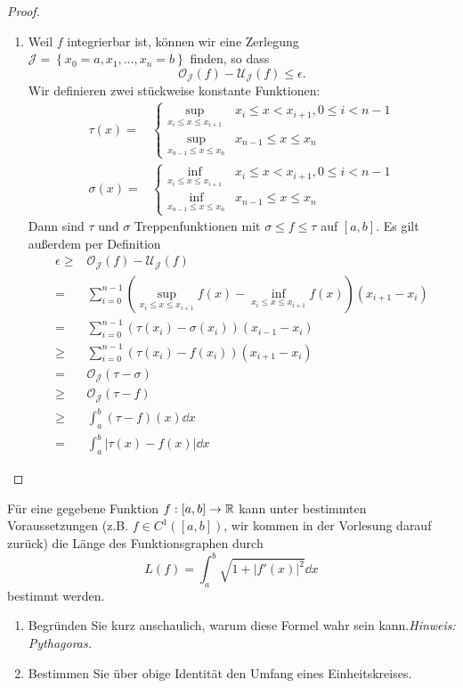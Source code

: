 \begin{proof}
	\begin{enumerate}[label=(\roman*)]
		\item Weil $f$ integrierbar ist, können wir eine Zerlegung $\mathcal{J}=\left\{ x_0=a,x_1,\dots, x_n=b \right\} $ finden, so dass
			\[
				\mathcal{O}_{\mathcal{J}}(f)-\mathcal{U}_{\mathcal{J}}(f)\le \epsilon
			.\] 
			Wir definieren zwei stückweise konstante Funktionen:
			\begin{align*}
				\tau(x)=&\begin{cases}\sup_{x_i \le x \le x_{i+1}} & x_i \le x < x_{i+1}, 0\le i <n-1\\
					\sup_{x_{n-1}\le x \le x_n} & x_{n-1} \le x \le x_n
				\end{cases}\\
				\sigma(x)=&\begin{cases}\inf_{x_i \le x \le x_{i+1}} & x_i \le x < x_{i+1}, 0\le i <n-1\\
					\inf_{x_{n-1}\le x \le x_n} & x_{n-1} \le x \le x_n
					\end{cases}
			\end{align*}
			Dann sind $\tau$ und $\sigma$ Treppenfunktionen mit $\sigma \le f \le \tau$ auf $[a,b]$. Es gilt außerdem per Definition
			\begin{align*}
				\epsilon\ge&\mathcal{O}_{\mathcal{J}}(f)-\mathcal{U}_{\mathcal{J}}(f)\\
				=&\sum_{i=0}^{n-1}\left( \sup_{x_i\le x\le x_{i+1}}f(x)-\inf_{x_i\le x\le x_{i+1}}f(x) \right)(x_{i+1}-x_i) \\
					=&\sum_{i=0}^{n-1}(\tau(x_i)-\sigma(x_i))(x_{i-1}-x_i)\\
					\ge&\sum_{i=0}^{n-1}\left( \tau(x_i)-f(x_i) \right)\left( x_{i+1}-x_i \right) \\
					=&\mathcal{O}_{\mathcal{J}}(\tau-\sigma)\\
					\ge& \mathcal{O}_{\mathcal{J}}(\tau - f)\\
					\ge& \int_a^b (\tau - f)(x)\dd{x}\\
					=&\int_a^b |\tau(x)-f(x)|\dd{x}
			\end{align*}
	\end{enumerate}
\end{proof}
\begin{Problem}
	F\"{u}r eine gegebene Funktion $f:[a,b]\to \mathbb{R}$ kann unter bestimmten Voraussetzungen (z.B. $f\in C^1([a,b])$, wir kommen in der Vorlesung darauf zurück) die Länge des Funktionsgraphen durch
	\[
		L(f)=\int_a^b \sqrt{1+|f'(x)|^2} \dd{x}\] 
		bestimmt werden.
		\begin{enumerate}[label=(\roman*)]
			\item Begründen Sie kurz anschaulich, warum diese Formel wahr sein kann.\emph{Hinweis: Pythagoras.}
			\item Bestimmen Sie über obige Identität den Umfang eines Einheitskreises.
		\end{enumerate}
\end{Problem}

